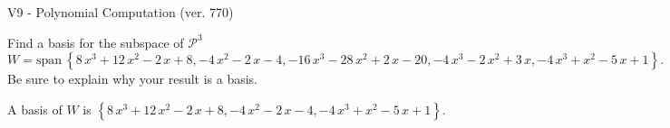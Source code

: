 \begin{exercise}
  \begin{exerciseTitle}V9 - Polynomial Computation (ver. 770)\end{exerciseTitle}
  \begin{exerciseStatement}
    Find a basis for the subspace of \(\mathcal{P}^3\) 
\[W=\mathrm{span}\ \left\{8 \, x^{3} + 12 \, x^{2} - 2 \, x + 8 , -4 \, x^{2} - 2 \, x - 4 , -16 \, x^{3} - 28 \, x^{2} + 2 \, x - 20 , -4 \, x^{3} - 2 \, x^{2} + 3 \, x , -4 \, x^{3} + x^{2} - 5 \, x + 1\right\}.\]
 Be sure to explain why your result is a basis.


  \end{exerciseStatement}
  \begin{exerciseAnswer}
   A basis of \(W\) is  \(\left\{8 \, x^{3} + 12 \, x^{2} - 2 \, x + 8 , -4 \, x^{2} - 2 \, x - 4 , -4 \, x^{3} + x^{2} - 5 \, x + 1\right\}\).
  


  \end{exerciseAnswer}
\end{exercise}